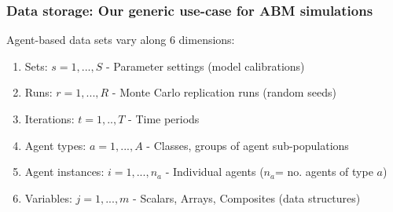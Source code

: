 \documentclass[9pt,sansserif]{beamer}
\newlength{\parskipbackup}
\newlength{\parindentbackup}
\let\notebackup\note
\renewcommand{\note}[1]{\notebackup{%
	\mode<handout>{\addtocounter{page}{-1}}%
	\setlength{\parindent}{0ex}%
	\setlength{\parskip}{10pt}%
	\noindent%
	{\normalsize{}#1}%
	\setlength{\parskip}{\parskipbackup}%
	\setlength{\parindent}{\parindentbackup}%
}%
}
\begin{document}
\begin{frame}{}\small
\frametitle{Data storage: Our generic use-case for ABM simulations}

Agent-based data sets vary along 6 dimensions:

\bigskip
\begin{enumerate}\itemsep2em

\item Sets: $s=1,...,S$ - Parameter settings (model calibrations)

\item Runs: $r=1,...,R$ - Monte Carlo replication runs (random seeds)

\item Iterations: $t=1,..,T$ - Time periods

\item Agent types: $a=1,...,A$ - Classes, groups of agent sub-populations

\item Agent instances: $i=1,...,n_a$ - Individual agents ($n_a$= no. agents of type $a$)

\item Variables: $j=1,...,m$ - Scalars, Arrays, Composites (data structures)
\end{enumerate}

\end{frame}
\note{
}

\end{document}
